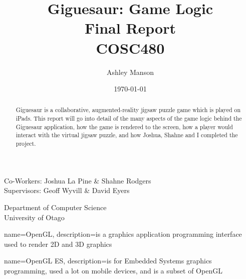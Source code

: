 \documentclass{article}
\begin{document}
\title{Giguesaur: Game Logic \\ Final Report \\ COSC480}
\author{Ashley Manson}
\date{\today}

\begin{titlepage}
\clearpage
\maketitle
\thispagestyle{empty} %

\begin{center}
\large 
Co-Workers: Joshua La Pine \& Shahne Rodgers\\
Supervisors: Geoff Wyvill \& David Eyers\\

\vspace*{1\baselineskip} %

Department of Computer Science\\
University of Otago

\end{center}

\end{titlepage}



\begin{abstract}
Giguesaur is a collaborative, augmented-reality jigsaw puzzle game which is
played on iPads. This report will go into detail of the many aspects of the game
logic behind the Giguesaur application, how the game is rendered to the screen,
how a player would interact with the virtual jigsaw puzzle, and how Joshua,
Shahne and I completed the project.
\end{abstract}

 { name={OpenGL}, description={is a graphics
    application programming interface used to render 2D and 3D graphics} }

 { name={OpenGL ES}, description={is for Embedded
    Systems graphics programming, used a lot on mobile devices, and is a subset
    of OpenGL} }
\end{document}
